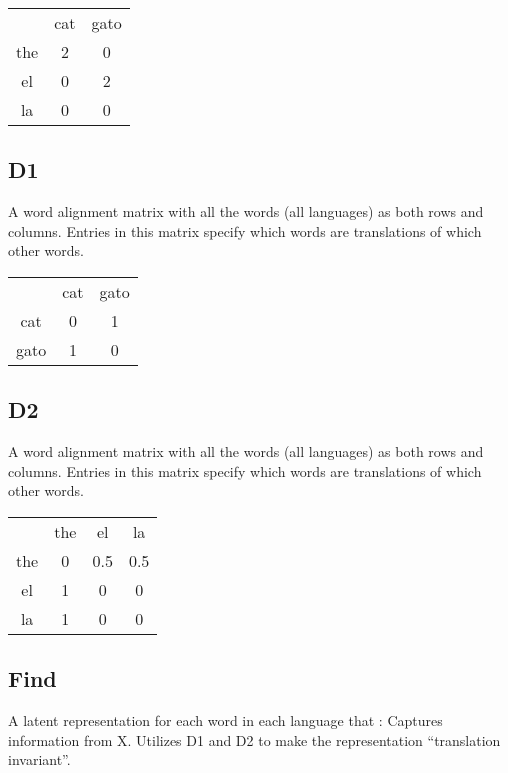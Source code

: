 \documentclass[11pt]{article}
\begin{document}
\begin{center}
\begin{tabular}{ |c|c|c| } 
  \hline
  & cat & gato \\ 
  the & 2 & 0 \\ 
  el & 0 & 2 \\ 
  la & 0 & 0 \\ 
  \hline
\end{tabular}
\end{center}

\subsection{D1}
A word alignment matrix with all the words (all languages) as both rows and columns.
Entries in this matrix specify which words are translations of which other words.


\begin{center}
\begin{tabular}{ |c|c|c| } 
  \hline
  & cat & gato \\ 
  cat & 0 & 1 \\ 
  gato & 1 & 0 \\ 
  \hline
\end{tabular}
\end{center}

\subsection{D2}
A word alignment matrix with all the words (all languages) as both rows and columns.
Entries in this matrix specify which words are translations of which other words.


\begin{center}
\begin{tabular}{ |c|c|c|c| } 
  \hline
  & the & el & la \\ 
  the & 0 & 0.5 & 0.5 \\ 
  el & 1 & 0 & 0 \\ 
  la & 1 & 0 & 0 \\ 
  \hline
\end{tabular}
\end{center}

\subsection{Find}
A latent representation for each word in each language that :
Captures information from X.
Utilizes D1 and D2 to make the representation “translation invariant”.
\end{document}
